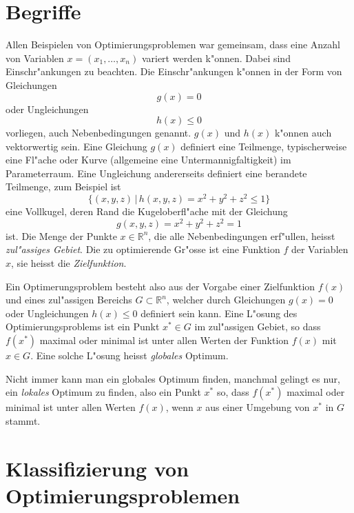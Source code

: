\section{Begriffe\label{section-begriffe}}
Allen Beispielen von Optimierungsproblemen war gemeinsam, dass eine
Anzahl von Variablen $x=(x_1,\dots,x_n)$ variert werden k"onnen.
Dabei sind Einschr"ankungen zu beachten.
Die Einschr"ankungen k"onnen in der Form von Gleichungen
\begin{equation}
g(x)=0
\label{begriff-nebenbedingungen}
\end{equation}
oder Ungleichungen
\begin{equation}
h(x)\le 0
\label{begriff-einschraenkungen}
\end{equation}
vorliegen, auch Nebenbedingungen genannt.
$g(x)$ und $h(x)$ k"onnen auch vektorwertig sein.
Eine Gleichung $g(x)$ definiert eine Teilmenge, typischerweise eine
Fl"ache oder Kurve (allgemeine eine Untermannigfaltigkeit) im 
Parameterraum.
Eine Ungleichung andererseits definiert eine berandete Teilmenge,
zum Beispiel ist
\[
\{(x,y,z)\,|\,h(x,y,z)=x^2+y^2+z^2\le 1\}
\]
eine Vollkugel, deren Rand die Kugeloberfl"ache mit der Gleichung
\[
g(x,y,z)=x^2+y^2+z^2=1
\]
ist.
Die Menge der Punkte $x\in\mathbb R^n$, die alle Nebenbedingungen
erf"ullen, heisst {\it zul"assiges Gebiet}.
Die zu optimierende Gr"osse ist eine Funktion $f$ der Variablen $x$,
sie heisst die {\it Zielfunktion}.

Ein Optimerungsproblem besteht also aus der Vorgabe einer Zielfunktion
$f(x)$ und eines zul"assigen Bereichs $G\subset \mathbb R^n$, welcher
durch Gleichungen $g(x)=0$ oder Ungleichungen $h(x)\le 0$ 
definiert sein kann.
Eine L"osung des Optimierungsproblems ist ein Punkt $x^*\in G$ im zul"assigen
Gebiet, so dass $f(x^*)$ maximal oder minimal ist unter allen Werten
der Funktion $f(x)$ mit $x\in G$. Eine solche L"osung heisst
{\it globales} Optimum.

Nicht immer kann man ein globales Optimum finden, manchmal gelingt es
nur, ein {\it lokales} Optimum zu finden, also ein Punkt $x^*$ so,
dass $f(x^*)$ maximal oder minimal ist unter allen Werten $f(x)$,
wenn $x$ aus einer Umgebung von $x^*$ in $G$ stammt.



\section{Klassifizierung von Optimierungsproblemen\label{section-klassifizierung}}
